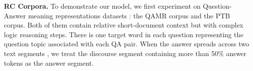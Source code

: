 \textbf{RC Corpora.}
To demonstrate our model, we first experiment on Question-Answer meaning representations datasets \cite{DBLP:conf/naacl/MichaelSHDZ18}: the QAMR corpus and the PTB corpus. Both of them contain relative short-document context but with complex logic reasoning steps. 
There is one target word in each question representing the question topic associated with each QA pair. %
When the answer spreads across two text segments , we treat the discourse segment containing more than 50\% answer tokens as the answer segment.

